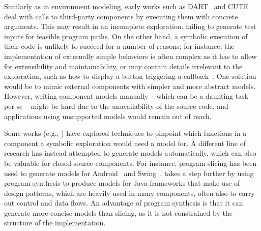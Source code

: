 {%
Similarly as in environment modeling, early works such as {\sc DART}~\cite{DART-PLDI05} and {\sc CUTE}~\cite{CUTE-FSE05} deal with calls to third-party components by executing them with concrete arguments. This may result in an incomplete exploration, failing to generate test inputs for feasible program paths. On the other hand, a symbolic execution of their code is unlikely to succeed for a number of reasons: for instance, the implementation of externally simple behaviors is often complex as it has to allow for extensibility and maintainability, or may contain details irrelevant to the exploration, such as how to display a button triggering a callback~\cite{JQF-ICSE16}.
%
%
One solution would be to mimic external components with simpler and more abstract models. However, writing component models manually -- which can be a daunting task per se -- might be hard due to the  unavailability of the source code, and applications using unsupported models would remain out of reach.


Some  works (e.g., \cite{AOH-TACAS07,XXT-ICSE11}) have explored techniques to pinpoint which functions in a component a symbolic exploration would need a model for. A different line of research has instead attempted to generate models automatically, which can also be valuable for closed-source components. For instance, program slicing has been used to generate models for Android~\cite{VTV-SEN15} and Swing~\cite{CT-SEN14}. \cite{JQF-ICSE16} takes a step further by using program synthesis to produce models for Java frameworks that make use of design patterns, which are heavily used in many components, often also to carry out control and data flows. An advantage of program synthesis is that it can generate more concise models than slicing, as it is not constrained by the structure of the implementation. %


}
